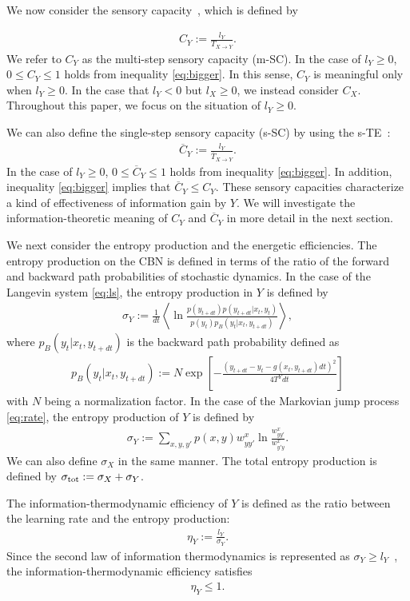 \documentclass[%
 reprint,
 amsmath,amssymb,
 aps,
]{revtex4-1}
\newcommand{\balign}[1]{\begin{align} #1 \end{align}}
\newcommand\mtr{T_{X\to Y}}
\newcommand\str{\overline{T}_{X\to Y}}
\theoremstyle{plain}
\begin{document}
We now consider the sensory capacity~\cite{Hartich2016,phd}, which is defined by

\balign{
C_Y:= \frac{l_Y}{\mtr}. 
}
We refer to $C_Y$ as the multi-step sensory capacity (m-SC). In the case of $l_Y\geq0$, $0\leq C_Y\leq 1$ holds from inequality \eqref{eq:bigger}. In this sense, $C_Y$ is meaningful only when $l_Y \geq 0$.  In the case that $l_Y <0$ but $l_X \geq 0$, we instead consider $C_X$.  Throughout this paper, we focus on the situation of $l_Y \geq 0$. 

We can also define the single-step sensory capacity (s-SC) by using the s-TE~\cite{phd}:
\balign{
\overline{C}_Y:=\frac{l_Y}{\str}. \label{eq:Dc}
}
In the case of $l_Y\geq0$, $0\leq \overline{C}_Y\leq 1$ holds from inequality \eqref{eq:bigger}. In addition, inequality \eqref{eq:bigger} implies that $\overline{C}_Y\leq C_Y$. These sensory capacities characterize a kind of effectiveness of information gain by $Y$.  We will investigate the information-theoretic meaning of $C_Y$ and $\overline{C}_Y$ in more detail in the next section. 

We next consider the entropy production and the energetic efficiencies. The entropy production on the CBN is defined in terms of the ratio of the forward and backward path probabilities of stochastic dynamics. In the case of the Langevin system \eqref{eq:ls}, the entropy production in $Y$ is defined by~\cite{Sekimoto}
\balign{
\sigma_Y:=\frac{1}{dt}\left< \ln \frac{p(y_{t+dt})p(y_{t+dt}|x_t,y_t)}{p(y_t)p_B(y_t|x_t,y_{t+dt})} \right>,
}
where $p_B(y_t|x_t,y_{t+dt})$ is the backward path probability defined as
\balign{
p_B(y_t|x_t,y_{t+dt}):=N\exp\left[-\frac{(y_{t+dt}-y_t-g(x_t,y_{t+dt})dt)^2}{4T^Ydt}\right]
}
with $N$ being a normalization factor. In the case of the Markovian jump process \eqref{eq:rate}, the entropy production of $Y$ is defined by~\cite{Seifert2012}
\balign{
\sigma_Y:=\sum_{x,y,y'}p(x,y)w^{x}_{yy'}\ln\frac{w^{x}_{yy'}}{w^{x}_{y'y}}.
}
We can also define $\sigma_{X}$ in the same manner.  The total entropy production is defined by $\sigma_{\rm tot} := \sigma_{X} + \sigma_{Y}$.

The information-thermodynamic efficiency of $Y$ is defined as the ratio between the learning rate and the entropy production:
\balign{
\eta_{Y}:=\frac{l_Y}{\sigma_Y}. \label{eq:Et}
}
Since the second law of information thermodynamics is represented as $\sigma_Y\geq l_{Y}$~\cite{Shiraishi2015(2),Horowitz2014(2)}, the information-thermodynamic efficiency satisfies 
\balign{
\eta_{Y}\leq 1. \label{eq:t2nd}
}
\end{document}
